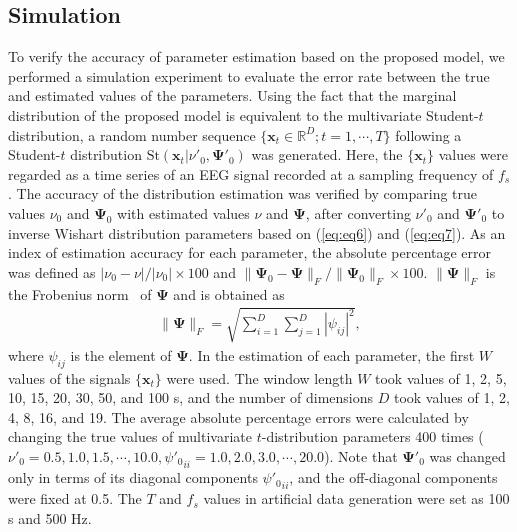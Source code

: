 \documentclass[journal]{IEEEtran}
\begin{document}
\subsection{Simulation}
To verify the accuracy of parameter estimation based on the proposed model, we performed a simulation experiment to evaluate the error rate between the true and estimated values of the parameters.
Using the fact that the marginal distribution of the proposed model is equivalent to the multivariate Student-$t$ distribution, a random number sequence $\{\mathbf{x}_t \in \mathbb{R}^D; t = 1, \cdots, T\}$ following a Student-$t$ distribution $\mathrm{St}(\mathbf{x}_t|\nu'_0, \mathbf{\Psi}'_0)$ was generated.
Here, the $\{\mathbf{x}_t \}$ values were regarded as a time series of an EEG signal recorded at a sampling frequency of $f_s$.
The accuracy of the distribution estimation was verified by comparing true values $\nu_0$ and $\mathbf{\Psi}_0$ with estimated values $\nu$ and $\mathbf{\Psi}$, after converting $\nu'_0$ and $\mathbf{\Psi}'_0$ to inverse Wishart distribution parameters based on (\ref{eq:eq6}) and (\ref{eq:eq7}).
As an index of estimation accuracy for each parameter, the absolute percentage error was defined as ${|\nu_0 -\nu|}/{|\nu_0|}\times100$ and ${\|\mathbf{\Psi}_0-\mathbf{\Psi}\|_F}/{\|\mathbf{\Psi}_0\|_F}\times100$.
$\|\mathbf{\Psi}\|_F$ is the Frobenius norm~\cite{GeneHowardGolub2013} of $\mathbf{\Psi}$ and is obtained as
%
\begin{align}%
	\|\mathbf{\Psi}\|_F=\sqrt{\sum_{i=1}^D \sum_{j=1}^D |{\psi_{ij}}|^2},
\end{align}
%
where ${\psi_{ij}}$ is the element of $\mathbf{\Psi}$.
In the estimation of each parameter, the first $W$ values of the signals $\{\mathbf{x}_t \}$ were used.
The window length $W$ took values of 1, 2, 5, 10, 15, 20, 30, 50, and 100 s, and the number of dimensions $D$ took values of 1, 2, 4, 8, 16, and 19.
The average absolute percentage errors were calculated by changing the true values of multivariate $t$-distribution parameters 400 times ($\nu'_0 = 0.5, 1.0, 1.5, \cdots, 10.0, {\psi'_0}_{ii} = 1.0, 2.0, 3.0, \cdots, 20.0$).
Note that $\mathbf{\Psi}'_0$ was changed only in terms of its diagonal components ${\psi'_0}_{ii}$, and the off-diagonal components were fixed at 0.5.
The $T$ and $f_s$ values in artificial data generation were set as 100 s and 500 Hz.
\end{document}
